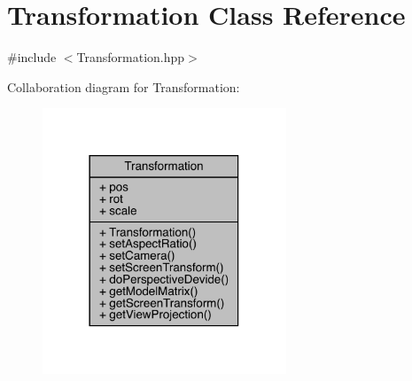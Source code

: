\hypertarget{class_transformation}{}\section{Transformation Class Reference}
\label{class_transformation}


{\ttfamily \#include $<$Transformation.\+hpp$>$}



Collaboration diagram for Transformation\+:\nopagebreak
\begin{figure}[H]
\begin{center}
\leavevmode
\includegraphics[width=206pt]{class_transformation__coll__graph}
\end{center}
\end{figure}
